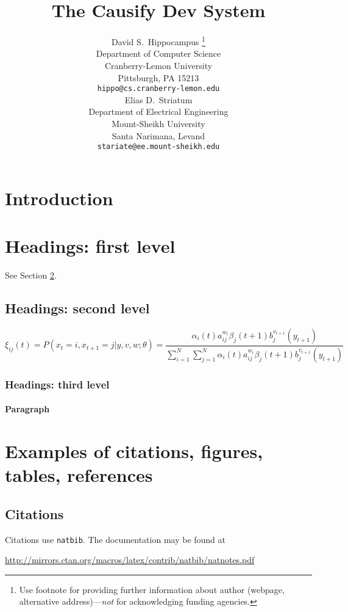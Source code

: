 \documentclass{article}
\title{The Causify Dev System}
\author{ David S.~Hippocampus
\thanks{Use footnote for providing further information about author (webpage,
alternative address)---\emph{not} for acknowledging funding agencies.}
\\ Department of Computer Science\\ Cranberry-Lemon University\\ Pittsburgh, PA
15213 \\ \texttt{hippo@cs.cranberry-lemon.edu} \\
\And Elias D.~Striatum \\ Department of Electrical Engineering\\ Mount-Sheikh University\\
Santa Narimana, Levand \\ \texttt{stariate@ee.mount-sheikh.edu} \\
}
\begin{document}
  \maketitle

  \begin{abstract}
    \lipsum[1]
  \end{abstract}


  \section{Introduction}
  \lipsum[2] \lipsum[3]

  \section{Headings: first level}
  \label{sec:headings}

  \lipsum[4] See Section \ref{sec:headings}.

  \subsection{Headings: second level}
  \lipsum[5]
  \begin{equation}
    \xi_{ij}(t)=P(x_{t}=i,x_{t+1}=j|y,v,w;\theta)={\frac{\alpha_{i}(t)a^{w_t}_{ij}\beta_{j}(t+1)b^{v_{t+1}}_{j}(y_{t+1})}{\sum_{i=1}^{N}\sum_{j=1}^{N}\alpha_{i}(t)a^{w_t}_{ij}\beta_{j}(t+1)b^{v_{t+1}}_{j}(y_{t+1})}}
  \end{equation}

  \subsubsection{Headings: third level}
  \lipsum[6]

  \paragraph{Paragraph}
  \lipsum[7]

  \section{Examples of citations, figures, tables, references}
  \label{sec:others}

  \subsection{Citations}
  Citations use \verb+natbib+. The documentation may be found at
  \begin{center}
    \url{http://mirrors.ctan.org/macros/latex/contrib/natbib/natnotes.pdf}
  \end{center}
\end{document}
